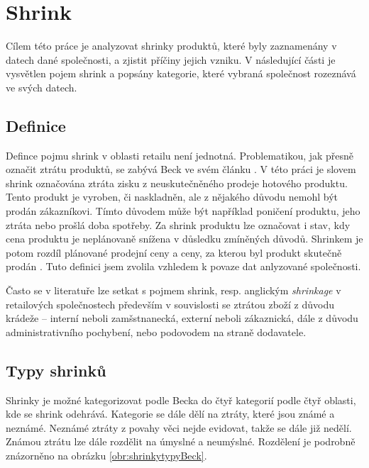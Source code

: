 \chapter{Shrink}

Cílem této práce je analyzovat shrinky produktů, které byly zaznamenány v datech dané společnosti, a zjistit příčiny jejich vzniku. V následující části je vysvětlen pojem shrink a popsány kategorie, které vybraná společnost rozeznává ve svých datech.

\section{Definice}

Defince pojmu shrink v oblasti retailu není jednotná. Problematikou, jak přesně označit ztrátu produktů, se zabývá Beck ve svém článku \cite{bib:shrink2}. V této práci je slovem shrink označována ztráta zisku z neuskutečněného prodeje hotového produktu. Tento produkt je vyroben, či naskladněn, ale z nějakého důvodu nemohl být prodán zákazníkovi. Tímto důvodem může být například poničení produktu, jeho ztráta nebo prošlá doba spotřeby. Za shrink produktu lze označovat i stav, kdy cena produktu je neplánovaně snížena v důsledku zmíněných důvodů. Shrinkem je potom rozdíl plánované prodejní ceny a ceny, za kterou byl produkt skutečně prodán \cite{bib:DefShrink}. Tuto definici jsem zvolila vzhledem k povaze dat anlyzované společnosti.

Často se v literatuře lze setkat s pojmem shrink, resp. anglickým \emph{shrinkage} v retailových společnostech především v souvislosti se ztrátou zboží z důvodu krádeže -- interní neboli zamšstnanecká, externí neboli zákaznická, dále z důvodu administrativního pochybení, nebo podovodem na straně dodavatele. \cite{bib:shrink1,bib:shrink2}



\section{Typy shrinků}
\label{sec:shrinkyTypy}

Shrinky je možné kategorizovat podle Becka do čtyř kategorií podle čtyř oblasti, kde se shrink odehrává. Kategorie se dále dělí na ztráty, které jsou známé a neznámé. Neznámé ztráty z povahy věci nejde evidovat, takže se dále již nedělí. Známou ztrátu lze dále rozdělit na úmyslné a neumýslné. Rozdělení je podrobně znázorněno na obrázku \ref{obr:shrinkytypyBeck}.

